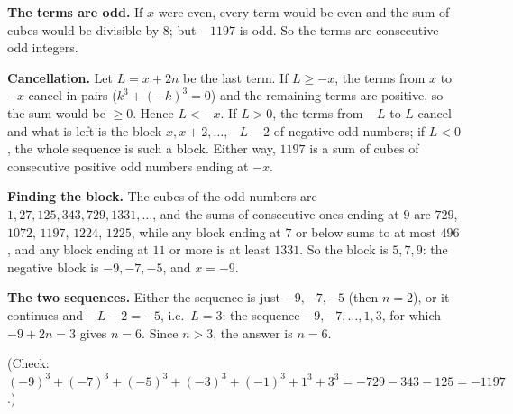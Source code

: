 \textbf{The terms are odd.} If $x$ were even, every term would be even and the sum of cubes would be divisible by $8$; but $-1197$ is odd. So the terms are consecutive odd integers.

\textbf{Cancellation.} Let $L=x+2n$ be the last term. If $L\ge-x$, the terms from $x$ to $-x$ cancel in pairs ($k^3+(-k)^3=0$) and the remaining terms are positive, so the sum would be $\ge0$. Hence $L<-x$. If $L>0$, the terms from $-L$ to $L$ cancel and what is left is the block $x,x+2,\dots,-L-2$ of negative odd numbers; if $L<0$, the whole sequence is such a block. Either way, $1197$ is a sum of cubes of consecutive positive odd numbers ending at $-x$.

\textbf{Finding the block.} The cubes of the odd numbers are $1,27,125,343,729,1331,\dots$, and the sums of consecutive ones ending at $9$ are $729$, $1072$, $1197$, $1224$, $1225$, while any block ending at $7$ or below sums to at most $496$, and any block ending at $11$ or more is at least $1331$. So the block is $5,7,9$: the negative block is $-9,-7,-5$, and $x=-9$.

\textbf{The two sequences.} Either the sequence is just $-9,-7,-5$ (then $n=2$), or it continues and $-L-2=-5$, i.e.\ $L=3$: the sequence $-9,-7,\dots,1,3$, for which $-9+2n=3$ gives $n=6$. Since $n>3$, the answer is $n=\boxed{6}$.

(Check: $(-9)^3+(-7)^3+(-5)^3+(-3)^3+(-1)^3+1^3+3^3=-729-343-125=-1197$.)
